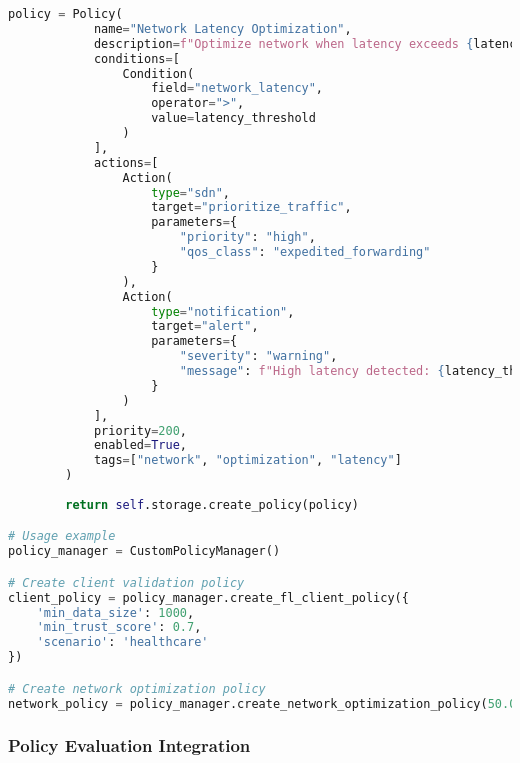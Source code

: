 \begin{lstlisting}[language=python, caption=Custom Policy Definition]
        policy = Policy(
            name="Network Latency Optimization",
            description=f"Optimize network when latency exceeds {latency_threshold}ms",
            conditions=[
                Condition(
                    field="network_latency",
                    operator=">",
                    value=latency_threshold
                )
            ],
            actions=[
                Action(
                    type="sdn",
                    target="prioritize_traffic",
                    parameters={
                        "priority": "high",
                        "qos_class": "expedited_forwarding"
                    }
                ),
                Action(
                    type="notification",
                    target="alert",
                    parameters={
                        "severity": "warning",
                        "message": f"High latency detected: {latency_threshold}ms"
                    }
                )
            ],
            priority=200,
            enabled=True,
            tags=["network", "optimization", "latency"]
        )
        
        return self.storage.create_policy(policy)

# Usage example
policy_manager = CustomPolicyManager()

# Create client validation policy
client_policy = policy_manager.create_fl_client_policy({
    'min_data_size': 1000,
    'min_trust_score': 0.7,
    'scenario': 'healthcare'
})

# Create network optimization policy
network_policy = policy_manager.create_network_optimization_policy(50.0)
\end{lstlisting}

\subsubsection{Policy Evaluation Integration}

